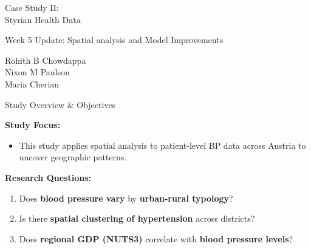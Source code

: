 {
\begin{frame}[noframenumbering]

\vspace{1.6cm}

\begin{center}
    {\fontsize{24}{28}\selectfont \color{tugreen}
    Case Study II: \\[0.3cm]
    Styrian Health Data}
\end{center}

\vspace{0.4cm}

\begin{center}
    {\large Week 5 Update: Spatial analysis and Model Improvements}
\end{center}

\vspace{0.3cm}

\begin{flushleft}
    {\normalsize
    Rohith B Chowdappa\\
    Nixon M Paulson\\
    Maria Cherian}
\end{flushleft}

\end{frame}
}

\begin{frame}{Study Overview \& Objectives}

\textbf{Study Focus:}
\begin{itemize}
    \item This study applies spatial analysis to patient-level BP data across Austria to uncover geographic patterns.
\end{itemize}

\textbf{Research Questions:}
\begin{enumerate}
    \item Does \textbf{blood pressure vary} by \textbf{urban-rural typology}?
    \item Is there \textbf{spatial clustering of hypertension} across districts?
    \item Does \textbf{regional GDP (NUTS3)} correlate with \textbf{blood pressure levels}?
\end{enumerate}

\end{frame}

